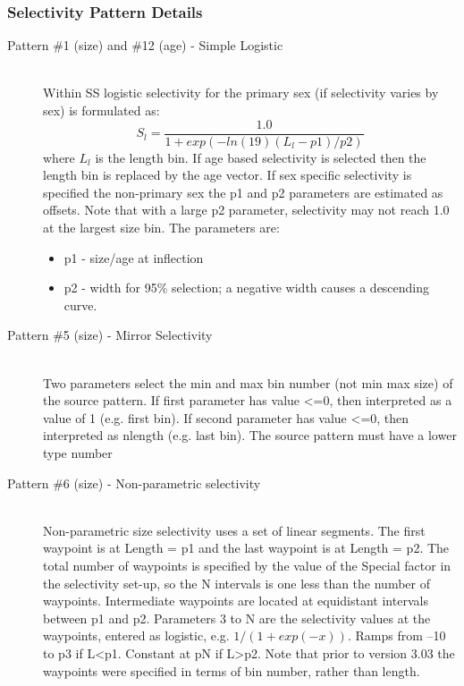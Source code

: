\subsubsection{Selectivity Pattern Details}
\begin{description}
	\item[Pattern \#1 (size) and \#12 (age) - Simple Logistic]\hfill\\
	Within SS logistic selectivity for the primary sex (if selectivity varies by sex) is formulated as:
	\begin{equation}
	S_l = \frac{1.0}{1+exp(-ln(19)(L_l - p1)/p2)}
	\end{equation}
	where $L_l$ is the length bin.  If age based selectivity is selected then the length bin is replaced by the age vector. If sex specific selectivity is specified the non-primary sex the p1 and p2 parameters are estimated as offsets.  Note that with a large p2 parameter, selectivity may not reach 1.0 at the largest size bin. The parameters are:
		\begin{itemize}
			\item p1 - size/age at inflection
			\item p2 - width for 95\% selection; a negative width causes a descending curve.
		\end{itemize}
\end{description}


\begin{description}
	\item[Pattern \#5 (size) - Mirror Selectivity]\hfil\\
	Two parameters select the min and max bin number (not min max size) of the source pattern.  If first parameter has value <=0, then interpreted as a value of 1 (e.g. first bin).  If second parameter has value <=0, then interpreted as nlength (e.g. last bin). The source pattern must have a lower type number
\end{description}	


\begin{description}
	\item[Pattern \#6 (size) - Non-parametric selectivity]\hfil\\
	Non-parametric size selectivity uses a set of linear segments.  The first waypoint is at Length = p1 and the last waypoint is at Length = p2.  The total number of waypoints is specified by the value of the Special factor in the selectivity set-up, so the N intervals is one less than the number of waypoints.  Intermediate waypoints are located at equidistant intervals between p1 and p2.  Parameters 3 to N are the selectivity values at the waypoints, entered as logistic, e.g. $1/(1+exp(-x))$.  Ramps from –10 to p3 if L<p1.  Constant at pN if L>p2.  Note that prior to version 3.03 the waypoints were specified in terms of bin number, rather than length.
\end{description}

